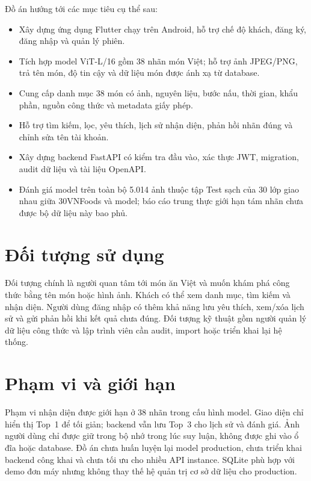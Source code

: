 Đồ án hướng tới các mục tiêu cụ thể sau:
\begin{itemize}
  \item Xây dựng ứng dụng Flutter chạy trên Android, hỗ trợ chế độ khách,
        đăng ký, đăng nhập và quản lý phiên.
  \item Tích hợp model ViT-L/16 gồm 38 nhãn món Việt; hỗ trợ ảnh JPEG/PNG,
        trả tên món, độ tin cậy và dữ liệu món được ánh xạ từ database.
  \item Cung cấp danh mục 38 món có ảnh, nguyên liệu, bước nấu, thời gian,
        khẩu phần, nguồn công thức và metadata giấy phép.
  \item Hỗ trợ tìm kiếm, lọc, yêu thích, lịch sử nhận diện, phản hồi nhãn
        đúng và chỉnh sửa tên tài khoản.
  \item Xây dựng backend FastAPI có kiểm tra đầu vào, xác thực JWT, migration,
        audit dữ liệu và tài liệu OpenAPI.
  \item Đánh giá model trên toàn bộ 5.014 ảnh thuộc tập Test sạch của 30 lớp
        giao nhau giữa 30VNFoods và model; báo cáo trung thực giới hạn tám
        nhãn chưa được bộ dữ liệu này bao phủ.
\end{itemize}

\section{Đối tượng sử dụng}

Đối tượng chính là người quan tâm tới món ăn Việt và muốn khám phá công thức
bằng tên món hoặc hình ảnh. Khách có thể xem danh mục, tìm kiếm và nhận diện.
Người dùng đăng nhập có thêm khả năng lưu yêu thích, xem/xóa lịch sử và gửi
phản hồi khi kết quả chưa đúng. Đối tượng kỹ thuật gồm người quản lý dữ liệu
công thức và lập trình viên cần audit, import hoặc triển khai lại hệ thống.

\section{Phạm vi và giới hạn}

Phạm vi nhận diện được giới hạn ở 38 nhãn trong cấu hình model. Giao diện chỉ
hiển thị Top~1 để tối giản; backend vẫn lưu Top~3 cho lịch sử và đánh giá. Ảnh
người dùng chỉ được giữ trong bộ nhớ trong lúc suy luận, không được ghi vào ổ
đĩa hoặc database. Đồ án chưa huấn luyện lại model production, chưa triển khai
backend công khai và chưa tối ưu cho nhiều API instance. SQLite phù hợp với
demo đơn máy nhưng không thay thế hệ quản trị cơ sở dữ liệu cho production.

